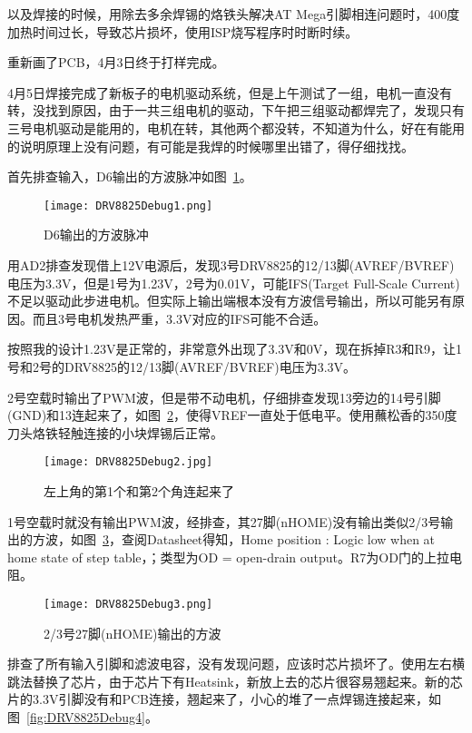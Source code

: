 以及焊接的时候，用除去多余焊锡的烙铁头解决AT Mega引脚相连问题时，400度加热时间过长，导致芯片损坏，使用ISP烧写程序时时断时续。

重新画了PCB，4月3日终于打样完成。

4月5日焊接完成了新板子的电机驱动系统，但是上午测试了一组，电机一直没有转，没找到原因，由于一共三组电机的驱动，下午把三组驱动都焊完了，发现只有三号电机驱动是能用的，电机在转，其他两个都没转，不知道为什么，好在有能用的说明原理上没有问题，有可能是我焊的时候哪里出错了，得仔细找找。

首先排查输入，D6输出的方波脉冲如图~\ref{fig:DRV8825Debug1}。

\begin{figure}[htbp]
    \centering
    \texttt{[image: DRV8825Debug1.png]}
    \caption{D6输出的方波脉冲}
    \label{fig:DRV8825Debug1}
\end{figure}

用AD2排查发现借上12V电源后，发现3号DRV8825的12/13脚(AVREF/BVREF)电压为3.3V，但是1号为1.23V，2号为0.01V，可能IFS(Target Full-Scale Current)不足以驱动此步进电机。但实际上输出端根本没有方波信号输出，所以可能另有原因。而且3号电机发热严重，3.3V对应的IFS可能不合适。

按照我的设计1.23V是正常的，非常意外出现了3.3V和0V，现在拆掉R3和R9，让1号和2号的DRV8825的12/13脚(AVREF/BVREF)电压为3.3V。

2号空载时输出了PWM波，但是带不动电机，仔细排查发现13旁边的14号引脚(GND)和13连起来了，如图~\ref{fig:DRV8825Debug2}，使得VREF一直处于低电平。使用蘸松香的350度刀头烙铁轻触连接的小块焊锡后正常。

\begin{figure}[htbp]
    \centering
    \texttt{[image: DRV8825Debug2.jpg]}
    \caption{左上角的第1个和第2个角连起来了}
    \label{fig:DRV8825Debug2}
\end{figure}

1号空载时就没有输出PWM波，经排查，其27脚(nHOME)没有输出类似2/3号输出的方波，如图~\ref{fig:DRV8825Debug-25}，查阅Datasheet得知，Home position : Logic low when at home state of step table，；类型为OD = open-drain output。R7为OD门的上拉电阻。

\begin{figure}[htbp]
    \centering
    \texttt{[image: DRV8825Debug3.png]}
    \caption{2/3号27脚(nHOME)输出的方波}
    \label{fig:DRV8825Debug-25}
\end{figure}

排查了所有输入引脚和滤波电容，没有发现问题，应该时芯片损坏了。使用左右横跳法替换了芯片，由于芯片下有Heatsink，新放上去的芯片很容易翘起来。新的芯片的3.3V引脚没有和PCB连接，翘起来了，小心的堆了一点焊锡连接起来，如图~\ref{fig:DRV8825Debug4}。

